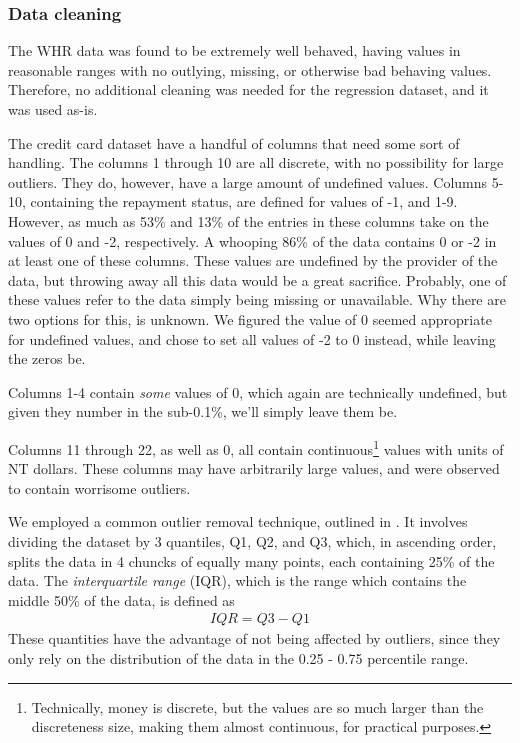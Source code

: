 \documentclass[10pt, twocolumn]{article}
\begin{document}
\subsubsection{Data cleaning}
\label{sec:data_cleaning}
The WHR data was found to be extremely well behaved, having values in reasonable ranges with no outlying, missing, or otherwise bad behaving values. Therefore, no additional cleaning was needed for the regression dataset, and it was used as-is.

The credit card dataset have a handful of columns that need some sort of handling. The columns 1 through 10 are all discrete, with no possibility for large outliers. They do, however, have a large amount of undefined values. Columns 5-10, containing the repayment status, are defined for values of -1, and 1-9. However, as much as 53\% and 13\% of the entries in these columns take on the values of 0 and -2, respectively. A whooping 86\% of the data contains 0 or -2 in at least one of these columns. These values are undefined by the provider of the data, but throwing away all this data would be a great sacrifice. Probably, one of these values refer to the data simply being missing or unavailable. Why there are two options for this, is unknown. We figured the value of 0 seemed appropriate for undefined values, and chose to set all values of -2 to 0 instead, while leaving the zeros be.

Columns 1-4 contain \textit{some} values of 0, which again are technically undefined, but given they number in the sub-0.1\%, we'll simply leave them be.

Columns 11 through 22, as well as 0, all contain continuous\footnote{Technically, money is discrete, but the values are so much larger than the discreteness size, making them almost continuous, for practical purposes.} values with units of NT dollars. These columns may have arbitrarily large values, and were observed to contain worrisome outliers.

We employed a common outlier removal technique, outlined in \cite{TowardsDataScienceOutlier}. It involves dividing the dataset by 3 quantiles, Q1, Q2, and Q3, which, in ascending order, splits the data in 4 chuncks of equally many points, each containing 25\% of the data. The \textit{interquartile range} (IQR), which is the range which contains the middle 50\% of the data, is defined as
\begin{align*}
    IQR = Q3 - Q1
\end{align*}
These quantities have the advantage of not being affected by outliers, since they only rely on the distribution of the data in the 0.25 - 0.75 percentile range.
\end{document}
